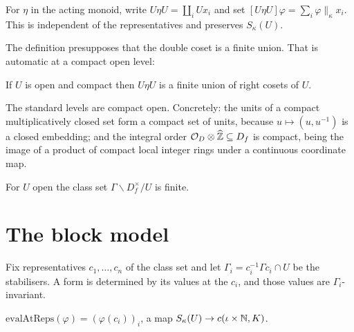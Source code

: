 \begin{definition}
  \label{def:heckeoperator}
  \leanok
  For $\eta$ in the acting monoid, write $U \eta U = \coprod_i U x_i$ and set $[U\eta U]\varphi =
  \sum_i \varphi \|_\kappa x_i$.  This is independent of the representatives and preserves
  $S_\kappa(U)$.
\end{definition}

The definition presupposes that the double coset is a finite union.  That is automatic at a
compact open level:

\begin{theorem}
  \label{thm:hecke-finiteness}
  \leanok
  If $U$ is open and compact then $U \eta U$ is a finite union of right cosets of $U$.
\end{theorem}

\begin{proposition}
  \label{prop:compact-open-levels}
  \leanok
  The standard levels are compact open.  Concretely: the units of a compact multiplicatively
  closed set form a compact set of units, because $u \mapsto (u, u^{-1})$ is a closed embedding;
  and the integral order $\mathcal{O}_D \otimes \widehat{\mathbb{Z}} \subseteq D_f$ is compact, being the image of a
  product of compact local integer rings under a continuous coordinate map.
\end{proposition}

\begin{theorem}[Fujisaki]
  \label{thm:fujisaki}
  \leanok
  For $U$ open the class set $\Gamma \backslash D_f^\times / U$ is finite.
\end{theorem}

\section{The block model}

Fix representatives $c_1, \dots, c_n$ of the class set and let $\Gamma_i = c_i^{-1}\Gamma c_i
\cap U$ be the stabilisers.  A form is determined by its values at the $c_i$, and those values
are $\Gamma_i$-invariant.

\begin{definition}
  \label{def:evalatreps}
  \leanok
  $\mathrm{evalAtReps}(\varphi) = (\varphi(c_i))_i$, a map $S_\kappa(U) \to c(\iota \times \mathbb{N},
  K)$.
\end{definition}

